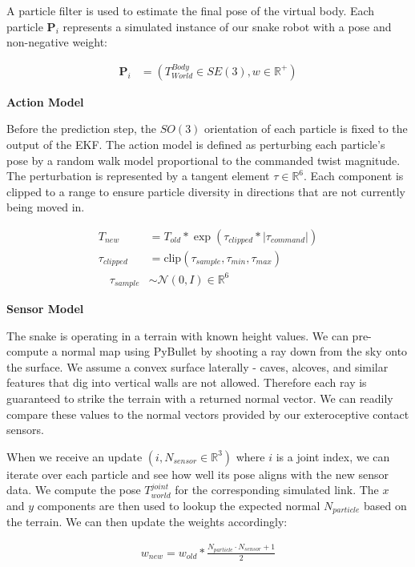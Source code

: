 \documentclass[letterpaper, 10 pt, conference]{ieeeconf}  %
\begin{document}
A particle filter is used to estimate the final pose of the virtual body. Each particle $\mathbf{P}_i$ represents a simulated instance of our snake robot with a pose and non-negative weight:

\begin{align}
    \mathbf{P}_i &= (T^{Body}_{World} \in SE(3), w \in \mathbb{R}^+)
\end{align}

\noindent \textbf{Action Model}

\noindent Before the prediction step, the $SO(3)$ orientation of each particle is fixed to the output of the EKF. The action model is defined as perturbing each particle's pose by a random walk model proportional to the commanded twist magnitude. The perturbation is represented by a tangent element $\tau \in \mathbb{R}^6$. Each component is clipped to a range to ensure particle diversity in directions that are not currently being moved in.

\begin{align}
    T_{new} &= T_{old} * \exp(\tau_{clipped} * |\tau_{command}|)
    \\
    \tau_{clipped} &= \text{clip}(\tau_{sample}, \tau_{min}, \tau_{max})
    \\
    \quad \tau_{sample} &\sim \mathcal{N}(0, I) \in \mathbb{R}^6
\end{align}

\noindent \textbf{Sensor Model}

\noindent The snake is operating in a terrain with known height values. We can pre-compute a normal map using PyBullet by shooting a ray down from the sky onto the surface. We assume a convex surface laterally - caves, alcoves, and similar features that dig into vertical walls are not allowed. Therefore each ray is guaranteed to strike the terrain with a returned normal vector. We can readily compare these values to the normal vectors provided by our exteroceptive contact sensors.

When we receive an update $(i, N_{sensor} \in \mathbb{R}^3)$ where $i$ is a joint index, we can iterate over each particle and see how well its pose aligns with the new sensor data. We compute the pose $T^{joint}_{world}$ for the corresponding simulated link. The $x$ and $y$ components are then used to lookup the expected normal $N_{particle}$ based on the terrain. We can then update the weights accordingly:

\begin{align}
    w_{new} = w_{old} * \frac{N_{particle} \cdot N_{sensor} + 1 }{2}
\end{align}
\end{document}
